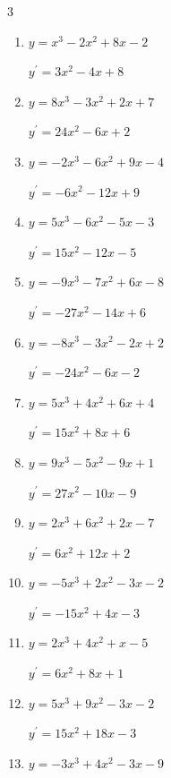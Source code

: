 \begin{multicols}{3}
\begin{enumerate}
        $\displaystyle y^{\prime}=-15x^{2}-10x+4$

  \item $y=x^{3}-2x^{2}+8x-2$

        $\displaystyle y^{\prime}=3x^{2}-4x+8$

\columnbreak %

  \item $y=8x^{3}-3x^{2}+2x+7$

        $\displaystyle y^{\prime}=24x^{2}-6x+2$

  \item $y=-2x^{3}-6x^{2}+9x-4$

        $\displaystyle y^{\prime}=-6x^{2}-12x+9$

  \item $y=5x^{3}-6x^{2}-5x-3$

        $\displaystyle y^{\prime}=15x^{2}-12x-5$

  \item $y=-9x^{3}-7x^{2}+6x-8$

        $\displaystyle y^{\prime}=-27x^{2}-14x+6$

  \item $y=-8x^{3}-3x^{2}-2x+2$

        $\displaystyle y^{\prime}=-24x^{2}-6x-2$

  \item $y=5x^{3}+4x^{2}+6x+4$

        $\displaystyle y^{\prime}=15x^{2}+8x+6$

  \item $y=9x^{3}-5x^{2}-9x+1$

        $\displaystyle y^{\prime}=27x^{2}-10x-9$

  \item $y=2x^{3}+6x^{2}+2x-7$

        $\displaystyle y^{\prime}=6x^{2}+12x+2$

  \item $y=-5x^{3}+2x^{2}-3x-2$

        $\displaystyle y^{\prime}=-15x^{2}+4x-3$

  \item $y=2x^{3}+4x^{2}+x-5$

        $\displaystyle y^{\prime}=6x^{2}+8x+1$

  \item $y=5x^{3}+9x^{2}-3x-2$

        $\displaystyle y^{\prime}=15x^{2}+18x-3$

  \item $y=-3x^{3}+4x^{2}-3x-9$


\end{enumerate}
\end{multicols}
